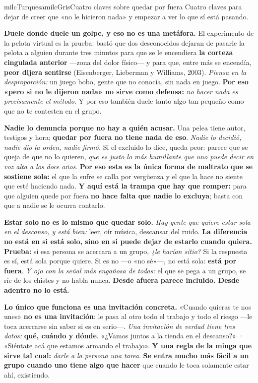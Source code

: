 \documentclass[11pt,letterpaper]{article}
\newcommand{\milcpaso}[3]{%
\Needspace{4\baselineskip}%
\begin{tcolorbox}[enhanced,colback=white,colframe=milcLinea,arc=1.5mm,boxrule=.9pt,
  left=14mm,right=4mm,top=3mm,bottom=3mm,before skip=4pt,after skip=4pt,
  fontupper=\RaggedRight,
  overlay={\node[anchor=north west,circle,fill=#2,text=white,inner sep=0pt,
    minimum size=7.4mm,font=\sffamily\bfseries\small]
    at ([xshift=3.6mm,yshift=-3.2mm]frame.north west) {#1};}]
#3
\end{tcolorbox}}
\begin{document}
\begin{softbox}{milcTurquesa}{milcGris}{Cuatro claves sobre quedar por fuera}
Cuatro claves para dejar de creer que «no le hicieron nada» y empezar a ver lo que sí está pasando.
\end{softbox}

\milcpaso{1}{milcTurquesa}{\textbf{Duele donde duele un golpe, y eso no es una metáfora.} El experimento de la pelota virtual es la prueba: bastó que dos desconocidos dejaran de pasarle la pelota a alguien durante tres minutos para que se le encendiera \textbf{la corteza cingulada anterior} ---zona del dolor físico--- y para que, entre más se encendía, \textbf{peor dijera sentirse} (Eisenberger, Lieberman y Williams, 2003). \emph{Piensa en la desproporción:} un juego bobo, gente que no conocía, sin nada en juego. \textbf{Por eso «pero si no le dijeron nada» no sirve como defensa:} \emph{no hacer nada es precisamente el método}. Y por eso también duele tanto algo tan pequeño como que no te contesten en el grupo.}
\milcpaso{2}{milcTurquesa}{\textbf{Nadie lo denuncia porque no hay a quién acusar.} Una pelea tiene autor, testigos y hora; \textbf{quedar por fuera no tiene nada de eso}. \emph{Nadie lo decidió, nadie dio la orden, nadie firmó.} Si el excluido lo dice, queda peor: parece que se queja de que no lo quieren, \emph{que es justo lo más humillante que uno puede decir en voz alta a los doce años}. \textbf{Por eso esta es la única forma de maltrato que se sostiene sola:} el que la sufre se calla por vergüenza y el que la hace no siente que esté haciendo nada. \textbf{Y aquí está la trampa que hay que romper:} para que alguien quede por fuera \textbf{no hace falta que nadie lo excluya}; basta con que a nadie se le ocurra contarlo.}
\milcpaso{3}{milcTurquesa}{\textbf{Estar solo no es lo mismo que quedar solo.} \emph{Hay gente que quiere estar sola en el descanso, y está bien:} leer, oír música, descansar del ruido. \textbf{La diferencia no está en si está solo, sino en si puede dejar de estarlo cuando quiera.} \textbf{Prueba:} si esa persona se acercara a un grupo, \emph{¿le harían sitio?} Si la respuesta es sí, está sola porque quiere. Si es no ---o «no sé»---, no está sola: \textbf{está por fuera}. \emph{Y ojo con la señal más engañosa de todas:} el que se pega a un grupo, se ríe de los chistes y no habla nunca. \textbf{Desde afuera parece incluido. Desde adentro no lo está.}}
\milcpaso{4}{milcTurquesa}{\textbf{Lo único que funciona es una invitación concreta.} «Cuando quieras te nos unes» \textbf{no es una invitación}: le pasa al otro todo el trabajo y todo el riesgo ---le toca acercarse sin saber si es en serio---. \emph{Una invitación de verdad tiene tres datos:} \textbf{qué, cuándo y dónde}. «¿Vamos juntos a la tienda en el descanso?» · «Siéntate acá que estamos armando el trabajo». \textbf{Y una regla de la minga que sirve tal cual:} \emph{darle a la persona una tarea}. \textbf{Se entra mucho más fácil a un grupo cuando uno tiene algo que hacer} que cuando le toca solamente estar ahí, existiendo.}
\end{document}
